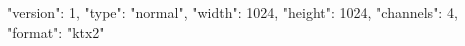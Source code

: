 {
  "version": 1,
  "type": "normal",
  "width": 1024,
  "height": 1024,
  "channels": 4,
  "format": "ktx2"
}
